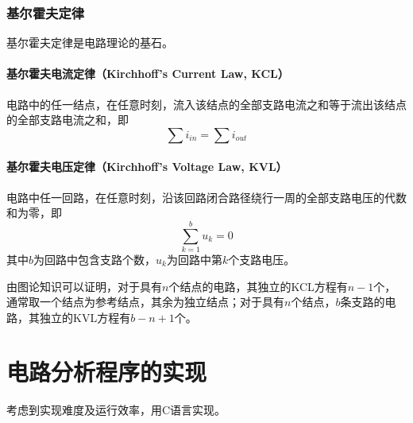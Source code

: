 \documentclass[UTF-8,cs4size]{ctexart}
\begin{document}
\subsubsection{基尔霍夫定律}
基尔霍夫定律是电路理论的基石。\\
\paragraph{\textbf{基尔霍夫电流定律（Kirchhoff's Current Law, KCL）}} 电路中的任一结点，在任意时刻，流入该结点的全部支路电流之和等于流出该结点的全部支路电流之和，即
\begin{equation}
	\sum i_{in} = \sum i_{out}
\end{equation}
\paragraph{\textbf{基尔霍夫电压定律（Kirchhoff's Voltage Law, KVL）}} 电路中任一回路，在任意时刻，沿该回路闭合路径绕行一周的全部支路电压的代数和为零，即
\begin{equation}
	\sum_{k=1}^{b}u_k = 0
\end{equation}
其中$b$为回路中包含支路个数，$u_k$为回路中第$k$个支路电压。


由图论知识可以证明，对于具有$n$个结点的电路，其独立的KCL方程有$n-1$个，通常取一个结点为参考结点，其余为独立结点；对于具有$n$个结点，$b$条支路的电路，其独立的KVL方程有$b-n+1$个。
\section{电路分析程序的实现}
考虑到实现难度及运行效率，用C语言实现。
\end{document}
